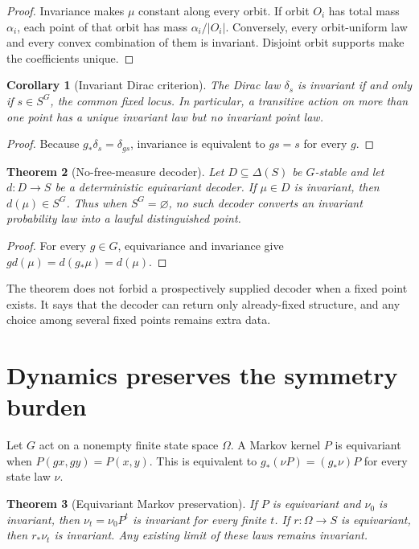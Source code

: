 \documentclass[11pt]{article}
\newtheorem{theorem}{Theorem}
\newtheorem{corollary}[theorem]{Corollary}
\theoremstyle{definition}
\begin{document}
\begin{proof}
Invariance makes \(\mu\) constant along every orbit.  If orbit \(O_i\)
has total mass \(\alpha_i\), each point of that orbit has mass
\(\alpha_i/|O_i|\).  Conversely, every orbit-uniform law and every convex
combination of them is invariant.  Disjoint orbit supports make the
coefficients unique.
\end{proof}

\begin{corollary}[Invariant Dirac criterion]\label{cor:dirac}
The Dirac law \(\delta_s\) is invariant if and only if
\(s\in S^G\), the common fixed locus.  In particular, a transitive action
on more than one point has a unique invariant law but no invariant point law.
\end{corollary}

\begin{proof}
Because \(g_*\delta_s=\delta_{gs}\), invariance is equivalent to
\(gs=s\) for every \(g\).
\end{proof}

\begin{theorem}[No-free-measure decoder]\label{thm:decoder}
Let \(D\subseteq\Delta(S)\) be \(G\)-stable and let
\(d:D\to S\) be a deterministic equivariant decoder.  If
\(\mu\in D\) is invariant, then \(d(\mu)\in S^G\).  Thus when
\(S^G=\varnothing\), no such decoder converts an invariant probability law
into a lawful distinguished point.
\end{theorem}

\begin{proof}
For every \(g\in G\), equivariance and invariance give
\(g d(\mu)=d(g_*\mu)=d(\mu)\).
\end{proof}

The theorem does not forbid a prospectively supplied decoder when a fixed
point exists.  It says that the decoder can return only already-fixed
structure, and any choice among several fixed points remains extra data.

\section{Dynamics preserves the symmetry burden}

Let \(G\) act on a nonempty finite state space \(\Omega\).  A Markov kernel
\(P\) is equivariant when
\(P(gx,gy)=P(x,y)\).  This is equivalent to
\(g_*(\nu P)=(g_*\nu)P\) for every state law \(\nu\).

\begin{theorem}[Equivariant Markov preservation]\label{thm:markov}
If \(P\) is equivariant and \(\nu_0\) is invariant, then
\(\nu_t=\nu_0P^t\) is invariant for every finite \(t\).  If
\(r:\Omega\to S\) is equivariant, then \(r_*\nu_t\) is invariant.
Any existing limit of these laws remains invariant.
\end{theorem}
\end{document}
